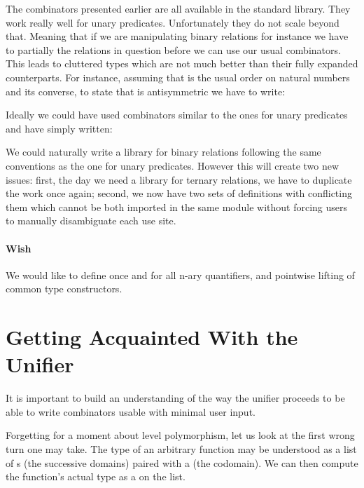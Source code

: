 The combinators presented earlier are all available in the standard library.
They work really well for unary predicates. Unfortunately they do not scale
beyond that. Meaning that if we are manipulating binary relations for
instance we have to partially the relations in question before we can use
our usual combinators. This leads to cluttered types which are not much better
than their fully expanded counterparts. For instance, assuming that 
is the usual order on natural numbers and  its converse, to state
that  is antisymmetric we have to write:


Ideally we could have used combinators similar to the ones for unary predicates
and have simply written:


We could naturally write a library for binary relations following the same
conventions as the one for unary predicates. However this will create two
new issues: first, the day we need a library for ternary relations, we have to
duplicate the work once again; second, we now have two sets of definitions
with conflicting them which cannot be both imported in the same module without
forcing users to manually disambiguate each use site.

\paragraph{Wish} We would like to define once and for all n-ary quantifiers,
and pointwise lifting of common type constructors.


\section{Getting Acquainted With the Unifier}

It is important to build an understanding of the way the unifier proceeds
to be able to write combinators usable with minimal user input.

Forgetting for a moment about level polymorphism, let us look at the first
wrong turn one may take. The type of an arbitrary function may be understood
as a list of s (the successive domains) paired with a  (the
codomain). We can then compute the function's actual type as a  on
the list.




